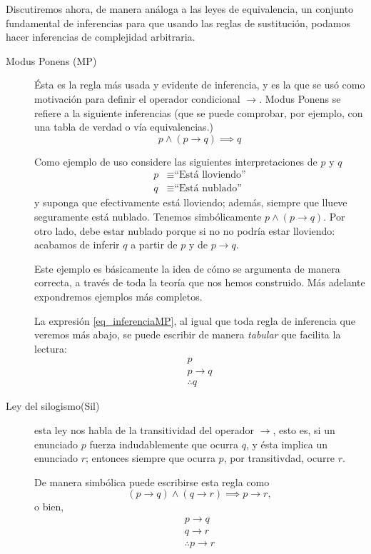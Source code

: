 \documentclass{book}
\theoremstyle{definition}
\begin{document}
Discutiremos ahora, de manera análoga a las leyes de equivalencia, un conjunto fundamental de inferencias para que usando las reglas de sustitución, podamos hacer inferencias de complejidad arbitraria.
\begin{description}
	\item[Modus Ponens (MP)] %
		Ésta es la regla más usada y evidente de inferencia, y es la que se usó como motivación para definir el operador condicional $\rightarrow$.
		Modus Ponens se refiere a la siguiente inferencias (que se puede comprobar, por ejemplo, con una tabla de verdad o vía equivalencias.)
		\begin{equation}\label{eq_inferenciaMP}
			p \wedge (p\rightarrow q) \implies q
		\end{equation}
		
		Como ejemplo de uso considere las siguientes interpretaciones de $p$ y $q$
		\begin{align*}
			p &\equiv \text{``Está lloviendo''}\\
			q &\equiv \text{``Está nublado''}
		\end{align*}
		y suponga que efectivamente está lloviendo; además, siempre que llueve seguramente está nublado.
		Tenemos simbólicamente $p \wedge (p\rightarrow q)$.
		Por otro lado, debe estar nublado porque si no no podría estar lloviendo: acabamos de inferir $q$ a partir de $p$ y de $p \rightarrow q$.
		
		Este ejemplo es básicamente la idea de cómo se argumenta de manera correcta, a través de toda la teoría que nos hemos construido. Más adelante expondremos ejemplos más completos.
		
		La expresión \ref{eq_inferenciaMP}, al igual que toda regla de inferencia que veremos más abajo, se puede escribir de manera \emph{tabular} que facilita la lectura:
		\begin{equation*}\begin{split}
				p \\ p \rightarrow q \\ \hline \therefore q
		\end{split}	\end{equation*}
	
	\item[Ley del silogismo(Sil)] esta ley nos habla de la transitividad del operador $\rightarrow$, esto es, si un enunciado $p$ fuerza indudablemente que ocurra $q$, y ésta implica un enunciado $r$; entonces siempre que ocurra $p$, por transitivdad, ocurre $r$.
	
	De manera simbólica puede escribirse esta regla como \[(p \rightarrow q)\wedge (q \rightarrow r) \implies p \rightarrow r,\]
	o bien,
		\begin{equation*}\begin{split}
		p \rightarrow q \\ q \rightarrow r \\ \hline \therefore p \rightarrow r
\end{split}	\end{equation*}
\end{description}
\end{document}
